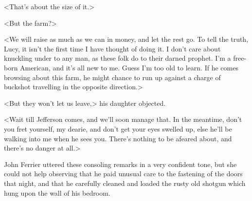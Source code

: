 <That's about the size of it.>

<But the farm?>

<We will raise as much as we can in money, and let the rest go. To tell the truth, Lucy, it isn't the first time I have thought of doing it. I don't care about knuckling under to any man, as these folk do to their darned prophet. I'm a free-born American, and it's all new to me. Guess I'm too old to learn. If he comes browsing about this farm, he might chance to run up against a charge of buckshot travelling in the opposite direction.>

<But they won't let us leave,> his daughter objected.

<Wait till Jefferson comes, and we'll soon manage that. In the meantime, don't you fret yourself, my dearie, and don't get your eyes swelled up, else he'll be walking into me when he sees you. There's nothing to be afeared about, and there's no danger at all.>

John Ferrier uttered these consoling remarks in a very confident tone, but she could not help observing that he paid unusual care to the fastening of the doors that night, and that he carefully cleaned and loaded the rusty old shotgun which hung upon the wall of his bedroom.